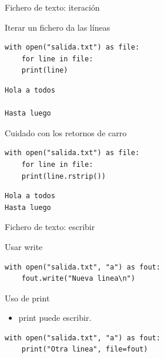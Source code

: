 \documentclass[bigger,unknownkeysallowed]{beamer}
\begin{document}
\begin{frame}[fragile,label={sec:org67ef8e9}]{Fichero de texto: iteración}
 \begin{block}{Iterar un fichero da las líneas}
\begin{verbatim}
with open("salida.txt") as file:
    for line in file:
	print(line)
\end{verbatim}
\scriptsize
\begin{verbatim}
Hola a todos

Hasta luego
\end{verbatim}
\end{block}

\begin{alertblock}{Cuidado con los retornos de carro}
\begin{verbatim}
with open("salida.txt") as file:
    for line in file:
	print(line.rstrip())
\end{verbatim}
\scriptsize
\begin{verbatim}
Hola a todos
Hasta luego
\end{verbatim}
\end{alertblock}
\end{frame}

\begin{frame}[fragile,label={sec:org9b3565e}]{Fichero de texto: escribir}
 \begin{block}{Usar write}
\begin{verbatim}
with open("salida.txt", "a") as fout:
    fout.write("Nueva linea\n")
\end{verbatim}
\scriptsize
\end{block}

\begin{block}{Uso de print}
\begin{itemize}
\item print puede escribir.
\end{itemize}

\begin{verbatim}
with open("salida.txt", "a") as fout:
    print("Otra linea", file=fout)
\end{verbatim}
\scriptsize
\end{block}
\end{frame}
\end{document}
